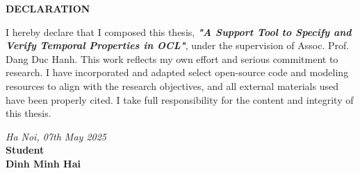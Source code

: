 \setlength{\parindent}{1cm}

\begin{center}
  \textbf{\large{DECLARATION}	}
\end{center}

I hereby declare that I composed this thesis, 
\textbf{\textit{"A Support Tool to Specify and Verify Temporal Properties in OCL"}},
under the supervision of Assoc. Prof. Dang Duc Hanh. 
This work reflects my own effort and serious commitment to research.
I have incorporated and adapted select open-source code and modeling resources to align with the research objectives, and all external materials used have been properly cited.
I take full responsibility for the content and integrity of this thesis.

\vspace{1cm}
\begin{flushright}
  \begin{minipage}{8cm}
    \centering
    \textit{Ha Noi, 07th May 2025}\\[0.2cm] %
    \textbf{Student}\\[2.5cm]

    \textbf{Dinh Minh Hai}
  \end{minipage}
\end{flushright}